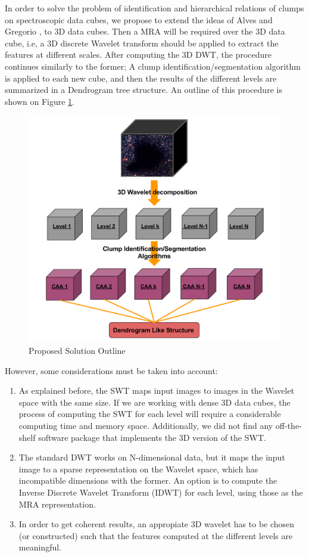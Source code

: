 \documentclass[letter, 11pt]{article}
\begin{document}
In order to solve the problem of identification and hierarchical relations of clumps on spectroscopic data cubes, we propose to extend the ideas of Alves \cite{Alves} and Gregorio \cite{Gregorio}, to 3D data cubes. Then a MRA will be required over the 3D data cube, i.e, a 3D discrete Wavelet transform should be applied to extract the features at different scales. After computing the 3D DWT, the procedure continues similarly to the former; A clump identification/segmentation algorithm is applied to each new cube, and then the results of the different levels are summarized in a Dendrogram tree structure. An outline of this procedure is shown on Figure \ref{fig:wavclump}.
\begin{figure}[htpb!]
\centering
\includegraphics[width=12cm]{wavclump}
\caption{Proposed Solution Outline}
\label{fig:wavclump}
\end{figure}
However, some considerations must be taken into account:
\begin{enumerate}
    \item As explained before, the SWT maps input images to images in the Wavelet space with the same size. If we are working with dense 3D data cubes, the process of computing the SWT for each level will require a considerable computing time and memory space. Additionally, we did not find any off-the-shelf software package that implements the 3D version of the SWT.
    \item The standard DWT works on N-dimensional data, but it maps the input image to a sparse representation on the Wavelet space, which has incompatible dimensions with the former. An option is to compute the Inverse Discrete Wavelet Transform (IDWT) for each level, using those as the MRA representation.
    \item In order to get coherent results, an appropiate 3D wavelet has to be chosen (or constructed) such that the features computed at the different levels are meaningful.
\end{enumerate}
\end{document}
